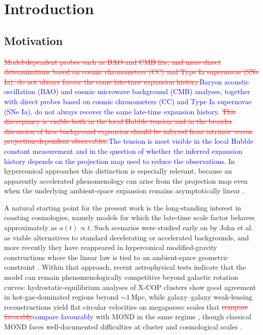 \documentclass[preprint,12pt]{elsarticle}
\begin{document}
\section{Introduction}

\subsection{Motivation}

\textcolor{red}{\sout{Model-dependent probes such as BAO and CMB fits, and more direct determinations based on cosmic chronometers (CC) and Type Ia supernovae (SNe Ia), do not always favour the same late-time expansion history.}}\textcolor{blue}{Baryon acoustic oscillation (BAO) and cosmic microwave background (CMB) analyses, together with direct probes based on cosmic chronometers (CC) and Type Ia supernovae (SNe Ia), do not always recover the same late-time expansion history.} \textcolor{red}{\sout{This discrepancy is visible both in the local Hubble tension and in the broader discussion of how background expansion should be inferred from intrinsic versus projection-dependent observables.}}\textcolor{blue}{The tension is most visible in the local Hubble constant measurement and in the question of whether the inferred expansion history depends on the projection map used to reduce the observations.} In hyperconical approaches this distinction is especially relevant, because an apparently accelerated phenomenology can arise from the projection map even when the underlying ambient-space expansion remains asymptotically linear \cite{monjo2018projected, monjo2023hubble}.

A natural starting point for the present work is the long-standing interest in coasting cosmologies, namely models for which the late-time scale factor behaves approximately as $a(t)\propto t$. Such scenarios were studied early on by John et al. \cite{john2000coasting, John2019} as viable alternatives to standard decelerating or accelerated backgrounds, and more recently they have reappeared in hyperconical modified-gravity constructions where the linear law is tied to an ambient-space geometric constraint \cite{monjo2017hyperconical, Monjo_2024, Monjo_2025}. Within that approach, recent astrophysical tests indicate that the model can remain phenomenologically competitive beyond galactic rotation curves: hydrostatic-equilibrium analyses of X-COP clusters show good agreement in hot-gas-dominated regions beyond $\sim1\,\mathrm{Mpc}$, while galaxy--galaxy weak-lensing reconstructions yield flat circular velocities on megaparsec scales that \textcolor{red}{\sout{compare favorably}}\textcolor{blue}{compare favourably} with MOND in the same regime \cite{monjo2025clusters, monjo2025lensing}, though classical MOND faces well-documented difficulties at cluster and cosmological scales \cite{oikonomou2026mond}.
\end{document}
